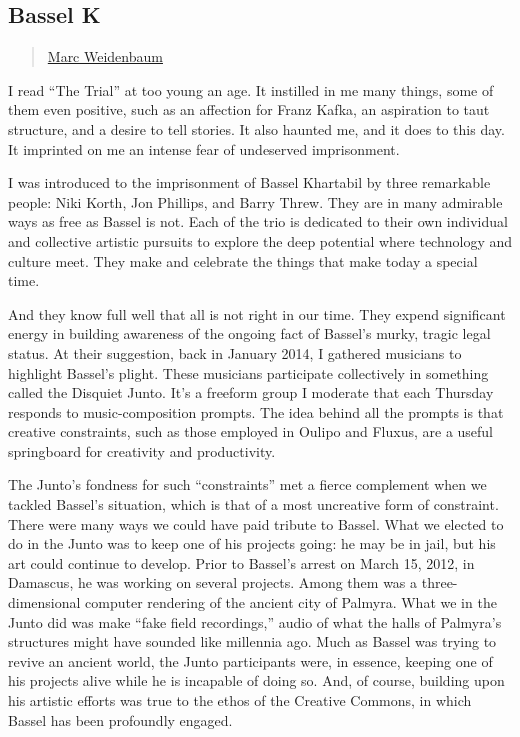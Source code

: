 \subsection{Bassel K}\label{bassel-k}

\begin{quote}
\hyperlink{marc-weidenbaum}{Marc Weidenbaum}
\end{quote}

I read ``The Trial'' at too young an age. It instilled in me many
things, some of them even positive, such as an affection for Franz
Kafka, an aspiration to taut structure, and a desire to tell stories. It
also haunted me, and it does to this day. It imprinted on me an intense
fear of undeserved imprisonment.

I was introduced to the imprisonment of Bassel Khartabil by three
remarkable people: Niki Korth, Jon Phillips, and Barry Threw. They are
in many admirable ways as free as Bassel is not. Each of the trio is
dedicated to their own individual and collective artistic pursuits to
explore the deep potential where technology and culture meet. They make
and celebrate the things that make today a special time.

And they know full well that all is not right in our time. They expend
significant energy in building awareness of the ongoing fact of Bassel's
murky, tragic legal status. At their suggestion, back in January 2014, I
gathered musicians to highlight Bassel's plight. These musicians
participate collectively in something called the Disquiet Junto. It's a
freeform group I moderate that each Thursday responds to
music-composition prompts. The idea behind all the prompts is that
creative constraints, such as those employed in Oulipo and Fluxus, are a
useful springboard for creativity and productivity.

The Junto's fondness for such ``constraints'' met a fierce complement
when we tackled Bassel's situation, which is that of a most uncreative
form of constraint. There were many ways we could have paid tribute to
Bassel. What we elected to do in the Junto was to keep one of his
projects going: he may be in jail, but his art could continue to
develop. Prior to Bassel's arrest on March 15, 2012, in Damascus, he was
working on several projects. Among them was a three-dimensional computer
rendering of the ancient city of Palmyra. What we in the Junto did was
make ``fake field recordings,'' audio of what the halls of Palmyra's
structures might have sounded like millennia ago. Much as Bassel was
trying to revive an ancient world, the Junto participants were, in
essence, keeping one of his projects alive while he is incapable of
doing so. And, of course, building upon his artistic efforts was true to
the ethos of the Creative Commons, in which Bassel has been profoundly
engaged.

